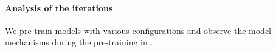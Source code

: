 
\paragraph{Analysis of the iterations} We pre-train models with various configurations and observe the model mechanisms during the pre-training in . 

